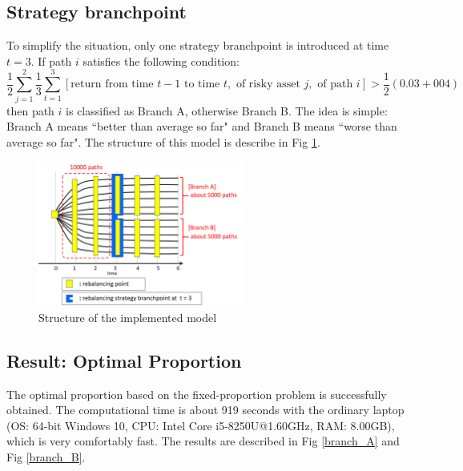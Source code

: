 \documentclass[11t]{article}
\begin{document}
\subsection{Strategy branchpoint}
To simplify the situation, only one strategy branchpoint is introduced at time $t=3$. If path $i$ satisfies the following condition:
\begin{equation*}
\frac{1}{2} \sum_{j=1}^{2} \frac{1}{3} \sum_{t=1}^{3} \left[ \textrm{return from time } t-1 \textrm{ to time } t, \textrm{ of risky asset } j, \textrm{ of path } i  \right] > \frac{1}{2} (0.03 + 004)
\end{equation*}
then path $i$ is classified as Branch A, otherwise Branch B. The idea is simple: Branch A means ``better than average so far" and Branch B means ``worse than average so far". The structure of this model is describe in Fig \ref{one_branch}.
\begin{figure}[htbp]
\centering
\includegraphics[width=0.6\textwidth]{one_branch.png}
\caption{Structure of the implemented model}
\label{one_branch}
\end{figure}

\subsection{Result: Optimal Proportion}
The optimal proportion based on the fixed-proportion problem is successfully obtained. The computational time is about 919 seconds with the ordinary laptop (OS: 64-bit Windows 10, CPU: Intel Core i5-8250U@1.60GHz, RAM: 8.00GB), which is very comfortably fast. The results are described in Fig \ref{branch_A} and Fig \ref{branch_B}.
\end{document}
